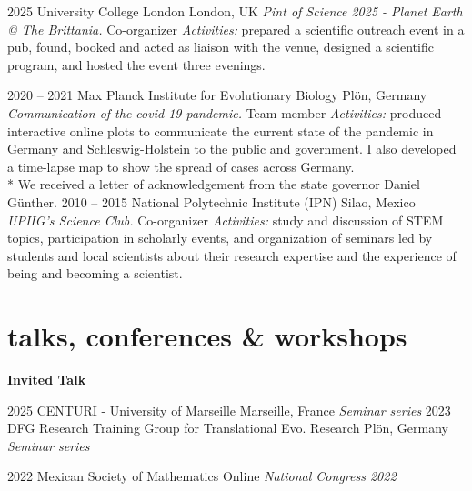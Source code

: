 \documentclass[]{friggeri-cv} %
\begin{document}
\begin{entrylist}
\entry
{2025}
{}
{University College London}
{London, UK}
{{\normalsize\emph{Pint of Science 2025 - Planet Earth @ The Brittania.} Co-organizer}}
{\emph{Activities:} prepared a scientific outreach event in a pub, found, booked and acted as liaison with the venue, designed a scientific program, and hosted the event three evenings.}
\end{entrylist}
\begin{entrylist}
\entry
{2020 -- 2021}
{}
{Max Planck Institute for Evolutionary Biology}
{Plön, Germany}
{{\normalsize\emph{Communication of the covid-19 pandemic.} Team member}}
{\emph{Activities:} produced interactive online plots to communicate the current state of the pandemic in  Germany and Schleswig-Holstein to the public and government. I also developed a time-lapse map to show the spread of cases across Germany.\\
\** We received a letter of acknowledgement from the state governor Daniel Günther.}
\entry
{2010 -- 2015}
{}
{National Polytechnic Institute (IPN)}
{Silao, Mexico}
{{\normalsize\emph{UPIIG’s Science Club.} Co-organizer}}
{\emph{Activities:} study and discussion of STEM topics, participation in scholarly events, and organization of seminars led by students and local scientists about their research expertise and the experience of being and becoming a scientist.}
\end{entrylist}


\section{talks, conferences \& workshops}

\textbf{Invited Talk}

\begin{entrylist}
\entry
{2025}
{}
{CENTURI - University of Marseille}
{Marseille, France}
{{\normalsize\emph{Seminar series}}}
{\vspace{-3mm}}
\entry
{2023}
{}
{DFG Research Training Group for Translational Evo. Research}
{Plön, Germany}
{{\normalsize\emph{Seminar series}}}
{\vspace{-3mm}}
\end{entrylist}
\begin{entrylist}
\entry
{2022}
{}
{Mexican Society of Mathematics}
{Online}
{{\normalsize\emph{National Congress 2022}}}
{\vspace{-3mm}}
\end{entrylist}
\end{document}

